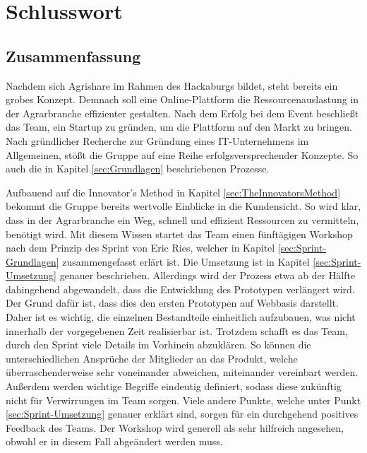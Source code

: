 \chapter{Schlusswort}
\section{Zusammenfassung}
Nachdem sich Agrishare im Rahmen des Hackaburgs bildet, steht bereits ein grobes Konzept. Demnach soll eine Online-Plattform die Ressourcenauslastung in der Agrarbranche effizienter gestalten. Nach dem Erfolg bei dem Event beschließt das Team, ein Startup zu gründen, um die Plattform auf den Markt zu bringen. Nach gründlicher Recherche zur Gründung eines IT-Unternehmens im Allgemeinen, stößt die Gruppe auf eine Reihe erfolgsversprechender Konzepte. So auch die in Kapitel \ref{sec:Grundlagen} beschriebenen Prozesse. 

Aufbauend auf die Innovator's Method in Kapitel \ref{sec:TheInnovatorsMethod} bekommt die Gruppe bereits wertvolle Einblicke in die Kundensicht. So wird klar, dass in der Agrarbranche ein Weg, schnell und effizient Ressourcen zu vermitteln, benötigt wird. Mit diesem Wissen startet das Team einen fünftägigen Workshop nach dem Prinzip des Sprint von Eric Ries, welcher in Kapitel \ref{sec:Sprint-Grundlagen} zusammengefasst erlärt ist. Die Umsetzung ist in Kapitel \ref{sec:Sprint-Umsetzung} genauer beschrieben. Allerdings wird der Prozess etwa ab der Hälfte dahingehend abgewandelt, dass die Entwicklung des Prototypen verlängert wird. Der Grund dafür ist, dass dies den ersten Prototypen auf Webbasis darstellt. Daher ist es wichtig, die einzelnen Bestandteile einheitlich aufzubauen, was nicht innerhalb der vorgegebenen Zeit realisierbar ist. Trotzdem schafft es das Team, durch den Sprint viele Details im Vorhinein abzuklären. So können die unterschiedlichen Ansprüche der Mitglieder an das Produkt, welche überraschenderweise sehr voneinander abweichen, miteinander vereinbart werden. Außerdem werden wichtige Begriffe eindeutig definiert, sodass diese zukünftig nicht für Verwirrungen im Team sorgen. Viele andere Punkte, welche unter Punkt \ref{sec:Sprint-Umsetzung} genauer erklärt sind, sorgen für ein durchgehend positives Feedback des Teams. Der Workshop wird generell als sehr hilfreich angesehen, obwohl er in diesem Fall abgeändert werden muss. 

